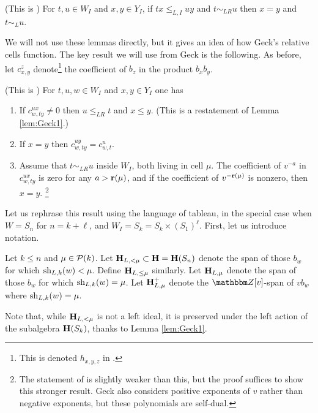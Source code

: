 \begin{lemma} \label{lem:Geck2} (This is \cite[Theorem 4.8]{GeckRelative}) For $t,u \in W_I$ and $x,y \in Y_I$, if $tx \le_{L,I} uy$ and $t \sim_{LR} u$ then $x = y$ and $t \sim_L u$.
\end{lemma}

We will not use these lemmas directly, but it gives an idea of how Geck's relative cells function. The key result we will use from Geck is the following. As before, let $c_{x,y}^z$ denote\footnote{This is denoted $h_{x,y,z}$ in \cite{GeckRelative}.} the coefficient of $b_z$ in the product $b_x b_y$.

\begin{lemma} \label{lem:Geck3} (This is \cite[Lemma 4.7]{GeckRelative}) For $t,u,w \in W_I$ and $x, y \in Y_I$ one has \begin{enumerate}
\item If $c_{w, ty}^{ux} \ne 0$ then $u \le_{LR} t$ and $x \le y$. (This is a restatement of Lemma \ref{lem:Geck1}.)
\item If $x=y$ then $c_{w,ty}^{uy} = c_{w,t}^{u}$.
\item Assume that $t \sim_{LR} u$ inside $W_I$, both living in cell $\mu$. The coefficient of $v^{-a}$ in $c_{w,ty}^{ux}$ is zero for any $a > \mathbf{r}(\mu)$, and if the coefficient of $v^{-\mathbf{r}(\mu)}$ is nonzero, then $x=y$. \footnote{The statement of \cite[Lemma 4.7]{GeckRelative} is slightly weaker than this, but the proof suffices to show this stronger result. Geck also considers positive exponents of $v$ rather than negative exponents, but these polynomials are self-dual.}
\end{enumerate} \end{lemma}

Let us rephrase this result using the language of tableau, in the special case when $W = S_n$ for $n = k + \ell$, and $W_I = S_k=S_k\times (S_1)^\ell$. First, let us introduce notation.

\begin{notation} \label{not:relideal} Let $k \le n$ and $\mu \in {\mathcal{P}}(k)$. Let ${\mathbf H}_{L,<\mu} \subset {\mathbf H} = {\mathbf H}(S_n)$ denote the span of those $b_w$ for which $\operatorname{sh}_{L,k}(w) < \mu$.
Define ${\mathbf H}_{L,\le \mu}$ similarly. Let ${\mathbf H}_{L,\mu}$ denote the span of those $b_w$ for which $\operatorname{sh}_{L,k}(w) = \mu$. Let ${\mathbf H}^+_{L,\mu}$ denote the $\Z[v]$-span of $vb_w$ where
$\operatorname{sh}_{L,k}(w) = \mu$. \end{notation}

Note that, while ${\mathbf H}_{L,<\mu}$ is not a left ideal, it is preserved under the left action of the subalgebra ${\mathbf H}(S_k)$, thanks to Lemma \ref{lem:Geck1}.

